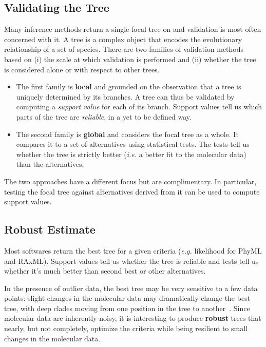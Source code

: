
\subsection{Validating the Tree} \label{sec:tree-validation}

Many inference methods return a single focal tree on  and validation is most often concerned with it. A tree is a complex object that encodes the evolutionary relationship of a set of species. There are two families of validation methods based on (i) the scale at which validation is performed and (ii) whether the tree is considered alone or with respect to other trees. 

\begin{itemize}
 \item The first family is \textbf{local} and grounded on the observation that a tree is uniquely determined by its branches. A tree can thus be validated by computing a \emph{support value} for each of its branch. Support values tell us which parts of the tree are \emph{reliable}, in a yet to be defined way. 
 \item The second family is \textbf{global} and considers the focal tree as a whole. It compares it to a set of alternatives using statistical tests. The tests tell us whether the tree is strictly better (\emph{i.e.} a better fit to the molecular data) than the alternatives. 
\end{itemize}

The two approaches have a different focus but are complimentary. In particular, testing the focal tree against alternatives derived from it can be used to compute support values. 

\subsection{Robust Estimate} \label{sec:robust-estimate}

Most softwares return the best tree for a given criteria (\emph{e.g.} likelihood for PhyML and RAxML). Support values tell us whether the tree is reliable and tests tell us whether it's much better than second best or other alternatives. 

In the presence of outlier data, the best tree may be very sensitive to a few data points: slight changes in the molecular data may dramatically change the best tree, with deep clades moving from one position in the tree to another~\citep{Bar-Hen2008}. Since molecular data are inherently noisy, it is interesting to produce \textbf{robust} trees that nearly, but not completely, optimize the criteria while being resilient to small changes in the molecular data. 

